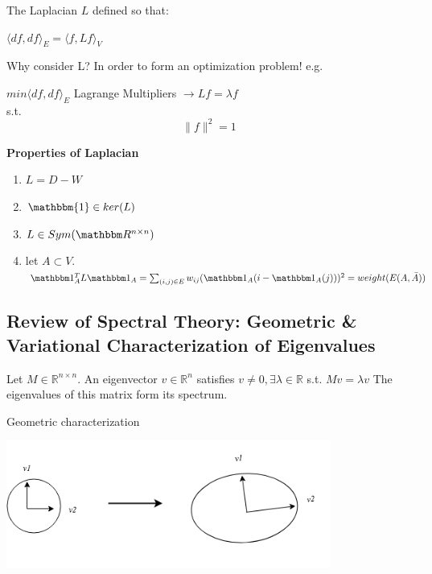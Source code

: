 {	The Laplacian $L$ defined so that:
	\begin{center}
		$\langle df, df\rangle_E = \langle f,Lf\rangle_V$
	\end{center}
	
	Why consider L? In order to form an optimization problem!
	e.g. 
	\begin{center}
		$min \langle df, df\rangle_E $ \indent Lagrange Multipliers $\rightarrow Lf = \lambda f$\\
		s.t. \[ \lVert f \rVert ^2 = 1 \]
	\end{center}
	
	\textbf{Properties of Laplacian}
	\begin{enumerate}
		\item $L = D - W$
		\item $\mathbbm{1} \in ker(L)$
		\item $L \in Sym(\mathbbm R^{n\times n})$
		\item let $A \subset V$. $\mathbbm 1_A^T L \mathbbm 1_A = \sum_{(i,j) \in E} w_{ij} (\mathbbm  1_A(i - \mathbbm 1_A(j)) )^2 = weight(E(A, \bar{A})) $
	\end{enumerate}
	
	\subsection{Review of Spectral Theory: Geometric \& Variational Characterization of Eigenvalues}
	
	\begin{definition}
		Let $M \in \mathbb R^{n \times n}$. An eigenvector $v \in \mathbb R^n$ satisfies $v \neq 0, \exists\lambda \in \mathbb R $ s.t. $Mv = \lambda v$
		The eigenvalues of this matrix form its spectrum.
	\end{definition}
	
	\begin{theorem}
		
		Geometric characterization
		
		\includegraphics[width=0.8\textwidth]{chapter_3/files/spec_clust_diag.png}
	\end{theorem}
	
}
